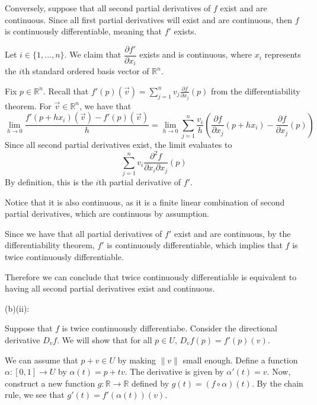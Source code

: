 \documentclass{article}
\theoremstyle{plain} %
\numberwithin{thm}{section} %
\theoremstyle{definition}
\begin{document}
\begin{question}{28}
        Conversely, suppose that all second partial derivatives of \(f\) exist and are continuous. Since all first partial derivatives will exist and are continuous, then \(f\) is continuously differentiable, meaning that \(f'\) exists.

        Let \(i \in \{1, ..., n\}\). We claim that \(\dfrac{\partial f'}{\partial x_i}\) exists and is continuous, where \(x_i\) represents the \(i\)th standard ordered basis vector of \(\mathbb{R}^n\).

        Fix \(p \in \mathbb{R}^n\). Recall that \(f'(p)(\vec{v}) = \sum_{j=1} ^n v_j \frac{\partial f}{\partial x_j}(p)\) from the differentiability theorem. For \(\vec{v} \in \mathbb{R}^n\), we have that
        \[
            \lim_{h \to 0} \frac{f'(p + hx_i)(\vec{v}) - f'(p)(\vec{v})}{h} = \lim_{h \to 0} \sum_{j=1} ^n \frac{v_i}{h}\left( \frac{\partial f}{\partial x_j} (p + hx_i) - \frac{\partial f}{\partial x_j} (p) \right)
        \]
        Since all second partial derivatives exist, the limit evaluates to
        \[
            \sum_{j=1} ^n v_i \frac{\partial ^2 f}{\partial x_i \partial x_j} (p)
        \]
        By definition, this is the \(i\)th partial derivative of \(f'\).

        Notice that it is also continuous, as it is a finite linear combination of second partial derivatives, which are continuous by assumption.
        
        Since we have that all partial derivatives of \(f'\) exist and are continuous, by the differentiability theorem, \(f'\) is continuously differentiable, which implies that \(f\) is twice continuously differentiable.

        Therefore we can conclude that twice continuously differentiable is equivalent to having all second partial derivatives exist and continuous.

        \medskip

        (b)(ii):

        Suppose that \(f\) is twice continuously differentiabe. Consider the directional derivative \(D_v f\). We will show that for all \(p\in U\), \(D_v f(p) = f'(p)(v)\).

        We can assume that \(p + v \in U\) by making \(\|v\|\) small enough. Define a function \(\alpha : [0,1] \to U\) by \(\alpha (t) = p + tv\). The derivative is given by \(\alpha '(t) = v\). Now, construct a new function \(g : \mathbb{R} \to \mathbb{R}\) defined by \(g(t) = (f \circ \alpha) (t)\). By the chain rule, we see that \(g'(t) = f'(\alpha (t)) (v)\).


\end{question}
\end{document}
